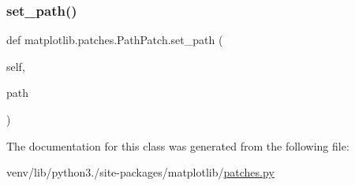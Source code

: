 \subsubsection{\texorpdfstring{set\+\_\+path()}{set\_path()}}
{\footnotesize\ttfamily def matplotlib.\+patches.\+Path\+Patch.\+set\+\_\+path (\begin{DoxyParamCaption}\item[{}]{self,  }\item[{}]{path }\end{DoxyParamCaption})}



The documentation for this class was generated from the following file\+:\begin{DoxyCompactItemize}
\item 
venv/lib/python3./site-\/packages/matplotlib/\hyperlink{patches_8py}{patches.\+py}\end{DoxyCompactItemize}
